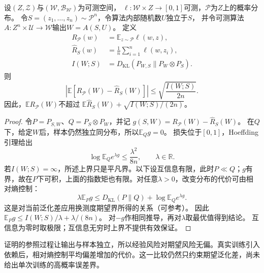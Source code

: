 \begin{theorem}[互信息与期望风险]
\label{thm:mutual-information-risk}
设$(Z,\mathcal Z)$与$(\mathcal W,\mathcal B_{\mathcal W})$为可测空间，
$\ell:\mathcal W\times Z\to[0,1]$可测，$\mathcal P$为$Z$上的概率分布。
令$S=(z_1,\ldots,z_n)\sim\mathcal P^n$，令算法内部随机数$U$独立于$S$，
并令可测算法$A:Z^n\times\mathcal U\to\mathcal W$输出$W=A(S,U)$。
定义
\[
\begin{aligned}
 R_{\mathcal P}(w)
 &=\mathbb E_{z\sim\mathcal P}\ell(w,z),\\
 \hat R_S(w)
 &=\frac1n\sum_{i=1}^n\ell(w,z_i),\\
 I(W;S)
 &=D_{\mathrm{KL}}(P_{W,S}\|P_W\otimes P_S).
\end{aligned}
\]
则
\begin{equation}
 \left|\mathbb E[R_{\mathcal P}(W)-\hat R_S(W)]\right|
 \leq\sqrt{\frac{I(W;S)}{2n}}.
 \label{eq:mutual-information-generalization}
\end{equation}
因此，$\mathbb E R_{\mathcal P}(W)$不超过
$\mathbb E\hat R_S(W)+\sqrt{I(W;S)/(2n)}$。
\end{theorem}
\begin{proof}
令$P=P_{S,W}$、$Q=P_S\otimes P_W$，并记
$g(S,W)=R_{\mathcal P}(W)-\hat R_S(W)$。
在$Q$下，给定$W$后，样本仍然独立同分布，所以$\mathbb E_Qg=0$。
损失位于$[0,1]$，Hoeffding引理给出
\[
 \log\mathbb E_Q e^{\lambda g}\leq\frac{\lambda^2}{8n},
 \qquad \lambda\in\mathbb R.
\]
若$I(W;S)=\infty$，所述上界只是平凡界。以下设互信息有限，此时$P\ll Q$；$g$有界，故在$P$下可积，上面的指数矩也有限。对任意$\lambda>0$，改变分布的代价可由相对熵控制：
\begin{equation}
 \lambda\mathbb E_Pg
 \leq D_{\mathrm{KL}}(P\|Q)+\log\mathbb E_Q e^{\lambda g}.
 \label{eq:information-change-measure}
\end{equation}
这是对当前泛化差应用换测度期望界所得的关系（可参考）。
因此$\mathbb E_Pg\leq I(W;S)/\lambda+\lambda/(8n)$。
对$-g$作相同推导，再对$\lambda$取最优值得到结论。
互信息为零时取极限；互信息无穷时上界不提供有效保证。
\end{proof}

证明的参照过程让输出与样本独立，所以经验风险对期望风险无偏。真实训练引入依赖后，相对熵控制平均偏差增加的代价。这一比较仍然只约束期望泛化差，尚未给出单次训练的高概率误差界。

